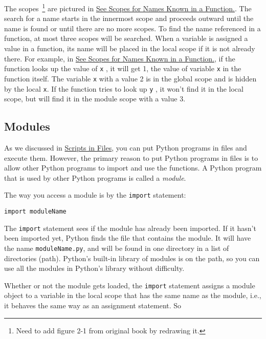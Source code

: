 The scopes~\footnote{Need to add figure 2-1 from original book by redrawing it.}  are pictured in
\href{chap2.html\#83458}{See Scopes for Names Known in a Function.}. The
search for a name starts in the innermost scope and proceeds outward
until the name is found or until there are no more scopes. To find the
name referenced in a function, at most three scopes will be searched.
When a variable is assigned a value in a function, its name will be
placed in the local scope if it is not already there. For example, in
\href{chap2.html\#83458}{See Scopes for Names Known in a Function.}, if
the function looks up the value of \texttt{x} , it will get 1, the value
of variable \texttt{x} in the function itself. The variable \texttt{x} with
a value 2 is in the global scope and is hidden by the local \texttt{x}.
If the function tries to look up \texttt{y} , it won't find it in the
local scope, but will find it in the module scope with a value 3.



\subsection{Modules}

As we discussed in
\href{chap2.html\#30113}{Scripts in Files}, you can put Python programs
in files and execute them. However, the primary reason to put Python
programs in files is to allow other Python programs to import and use
the functions. A Python program that is used by other Python programs is
called a \emph{module}.

The way you access a module is by the \texttt{import} statement:

\begin{verbatim}
import moduleName
\end{verbatim}

The \texttt{import} statement sees if
the module has already been imported. If it hasn't been imported yet,
Python finds the file that contains the module. It will have the name
\texttt{moduleName.py}, and will be found in one directory in a list of
directories (path). Python's built-in library of modules is on the path,
so you can use all the modules in Python's library without difficulty.

Whether or not the module gets
loaded, the \texttt{import} statement assigns a module object to a
variable in the local scope that has the same name as the module, i.e.,
it behaves the same way as an assignment statement. So

